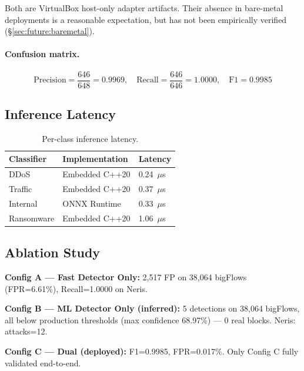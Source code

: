 \documentclass[11pt,a4paper]{article}
\begin{document}
    Both are VirtualBox host-only adapter artifacts. Their absence in bare-metal
    deployments is a reasonable expectation, but has not been empirically verified
    (\S\ref{sec:future:baremetal}).

    \paragraph{Confusion matrix.}
    \[
        \text{Precision} = \frac{646}{648} = 0.9969, \quad
        \text{Recall}    = \frac{646}{646} = 1.0000, \quad
        \text{F1}        = 0.9985
    \]

    \subsection{Inference Latency}

    \begin{table}[h]
        \centering
        \caption{Per-class inference latency.}
        \label{tab:latency}
        \begin{tabular}{lll}
            \toprule
            \textbf{Classifier} & \textbf{Implementation} & \textbf{Latency} \\
            \midrule
            DDoS        & Embedded C++20 & 0.24~$\mu$s \\
            Traffic     & Embedded C++20 & 0.37~$\mu$s \\
            Internal    & ONNX Runtime   & 0.33~$\mu$s \\
            Ransomware  & Embedded C++20 & 1.06~$\mu$s \\
            \bottomrule
        \end{tabular}
    \end{table}

    \subsection{Ablation Study}
    \label{sec:eval:ablation}

    \textbf{Config A --- Fast Detector Only:} 2,517 FP on 38,064 bigFlows (FPR=6.61\%),
    Recall=1.0000 on Neris.

    \textbf{Config B --- ML Detector Only (inferred):} 5 detections on 38,064 bigFlows, all
    below production thresholds (max confidence 68.97\%) --- 0 real blocks. Neris: attacks=12.

    \textbf{Config C --- Dual (deployed):} F1=0.9985, FPR=0.017\%. Only Config C fully
    validated end-to-end.
\end{document}
